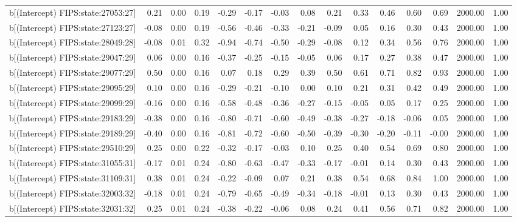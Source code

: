 \begin{table}[ht]
\begin{tabular}{rrrrrrrrrrrrrrr}
  b[(Intercept) FIPS:state:27053:27] & 0.21 & 0.00 & 0.19 & -0.29 & -0.17 & -0.03 & 0.08 & 0.21 & 0.33 & 0.46 & 0.60 & 0.69 & 2000.00 & 1.00 \\ 
  b[(Intercept) FIPS:state:27123:27] & -0.08 & 0.00 & 0.19 & -0.56 & -0.46 & -0.33 & -0.21 & -0.09 & 0.05 & 0.16 & 0.30 & 0.43 & 2000.00 & 1.00 \\ 
  b[(Intercept) FIPS:state:28049:28] & -0.08 & 0.01 & 0.32 & -0.94 & -0.74 & -0.50 & -0.29 & -0.08 & 0.12 & 0.34 & 0.56 & 0.76 & 2000.00 & 1.00 \\ 
  b[(Intercept) FIPS:state:29047:29] & 0.06 & 0.00 & 0.16 & -0.37 & -0.25 & -0.15 & -0.05 & 0.06 & 0.17 & 0.27 & 0.38 & 0.47 & 2000.00 & 1.00 \\ 
  b[(Intercept) FIPS:state:29077:29] & 0.50 & 0.00 & 0.16 & 0.07 & 0.18 & 0.29 & 0.39 & 0.50 & 0.61 & 0.71 & 0.82 & 0.93 & 2000.00 & 1.00 \\ 
  b[(Intercept) FIPS:state:29095:29] & 0.10 & 0.00 & 0.16 & -0.29 & -0.21 & -0.10 & 0.00 & 0.10 & 0.21 & 0.31 & 0.42 & 0.49 & 2000.00 & 1.00 \\ 
  b[(Intercept) FIPS:state:29099:29] & -0.16 & 0.00 & 0.16 & -0.58 & -0.48 & -0.36 & -0.27 & -0.15 & -0.05 & 0.05 & 0.17 & 0.25 & 2000.00 & 1.00 \\ 
  b[(Intercept) FIPS:state:29183:29] & -0.38 & 0.00 & 0.16 & -0.80 & -0.71 & -0.60 & -0.49 & -0.38 & -0.27 & -0.18 & -0.06 & 0.05 & 2000.00 & 1.00 \\ 
  b[(Intercept) FIPS:state:29189:29] & -0.40 & 0.00 & 0.16 & -0.81 & -0.72 & -0.60 & -0.50 & -0.39 & -0.30 & -0.20 & -0.11 & -0.00 & 2000.00 & 1.00 \\ 
  b[(Intercept) FIPS:state:29510:29] & 0.25 & 0.00 & 0.22 & -0.32 & -0.17 & -0.03 & 0.10 & 0.25 & 0.40 & 0.54 & 0.69 & 0.80 & 2000.00 & 1.00 \\ 
  b[(Intercept) FIPS:state:31055:31] & -0.17 & 0.01 & 0.24 & -0.80 & -0.63 & -0.47 & -0.33 & -0.17 & -0.01 & 0.14 & 0.30 & 0.43 & 2000.00 & 1.00 \\ 
  b[(Intercept) FIPS:state:31109:31] & 0.38 & 0.01 & 0.24 & -0.22 & -0.09 & 0.07 & 0.21 & 0.38 & 0.54 & 0.68 & 0.84 & 1.00 & 2000.00 & 1.00 \\ 
  b[(Intercept) FIPS:state:32003:32] & -0.18 & 0.01 & 0.24 & -0.79 & -0.65 & -0.49 & -0.34 & -0.18 & -0.01 & 0.13 & 0.30 & 0.43 & 2000.00 & 1.00 \\ 
  b[(Intercept) FIPS:state:32031:32] & 0.25 & 0.01 & 0.24 & -0.38 & -0.22 & -0.06 & 0.08 & 0.24 & 0.41 & 0.56 & 0.71 & 0.82 & 2000.00 & 1.00 \\ 

\end{tabular}
\end{table}
